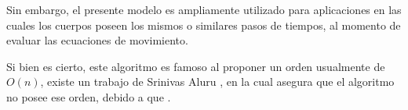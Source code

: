 Sin embargo, el presente modelo es ampliamente utilizado para aplicaciones
en las cuales los cuerpos poseen los mismos o similares
pasos de tiempos, al momento de evaluar las ecuaciones de movimiento.

Si bien es cierto,
este algoritmo es famoso al proponer un orden usualmente de $O(n)$,
existe un trabajo de Srinivas Aluru ,
en la cual asegura que el algoritmo no posee ese orden,
debido a que .

% 
% 

